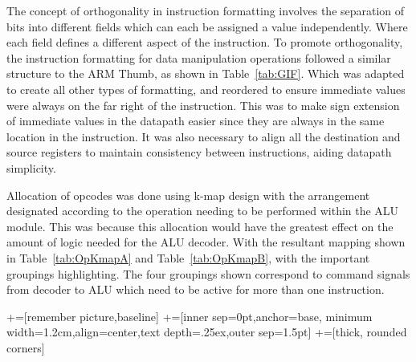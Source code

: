 The concept of orthogonality in instruction formatting involves the separation of bits into different fields which can each be assigned a value independently. Where each field defines a different aspect of the instruction. To promote orthogonality, the instruction formatting for data manipulation operations followed a similar structure to the ARM Thumb, as shown in Table~\ref{tab:GIF}. Which was adapted to create all other types of formatting, and reordered to ensure immediate values were always on the far right of the instruction. This was to make sign extension of immediate values in the datapath easier since they are always in the same location in the instruction. It was also necessary to align all the destination and source registers to maintain consistency between instructions, aiding datapath simplicity. 

Allocation of opcodes was done using k-map design with the arrangement designated according to the operation needing to be performed within the ALU module. This was because this allocation would have the greatest effect on the amount of logic needed for the ALU decoder. With the resultant mapping shown in Table~\ref{tab:OpKmapA} and Table~\ref{tab:OpKmapB}, with the important groupings highlighting. The four groupings shown correspond to command signals from decoder to ALU which need to be active for more than one instruction. 

\newcommand\tabnode[1]{\addtocounter{nodecount}{1} \tikz \node (\arabic{nodecount}) {#1};}

+=[remember picture,baseline]
+=[inner sep=0pt,anchor=base,
minimum width=1.2cm,align=center,text depth=.25ex,outer sep=1.5pt]
+=[thick, rounded corners]

\newcommand{\darkercolor}[3]{%
    \colorlet{#3}{#1!#2!black}
}
\darkercolor{green}{60}{darkgreen}

